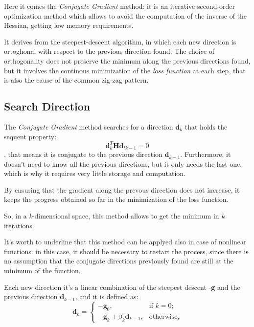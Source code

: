 		Here it comes the \textit{Conjugate Gradient} method: it is an iterative second-order optimization method which allows to avoid the computation of the inverse of the Hessian, getting low memory requirements.

		It derives from the steepest-descent algorithm, in which each new direction is ortoghonal with respect to the previous direction found.
		The choice of orthogonality does not preserve the minimum along the previous directions found, but it involves the continous minimization of the \textit{loss function} at each step, that is also the cause of the common zig-zag pattern. 

		\subsection{Search Direction}

		The \textit{Conjugate Gradient} method searches for a direction $\textbf{d}_k$ that holds the sequent property:
		\begin{equation} 
		\textbf{d}_k^T\textbf{H}\textbf{d}_{tk-1} = 0 
		\end{equation}, that means it is conjugate to the previous direction $\textbf{d}_{k-1}$. Furthermore, it doesn't need to know all the previous directions, but it only needs the last one, which is why it requires very little storage and computation.

		By ensuring that the gradient along the prevous direction does not increase, it keeps the progress obtained so far in the minimization of the loss function.

		So, in a \textit{k}-dimensional space, this method allows to get the minimum in \textit{k} iterations.

		It's worth to underline that this method can be applyed also in case of nonlinear functions: in this case, it should be necessary to restart the process, since there is no assumption that the conjugate directions previously found are still at the minimum of the function. 

		Each new direction it's a linear combination of the steepest descent -\textbf{g} and the previous direction $\textbf{d}_{k-1}$, and it is defined as:
		\begin{equation}
		  \textbf{d}_k=\begin{cases}
		    -\textbf{g}_0, & \text{if $k=0$};\\
		    -\textbf{g}_k + \beta_k\textbf{d}_{k-1}, & \text{otherwise,}
		  \end{cases}
		\end{equation}

